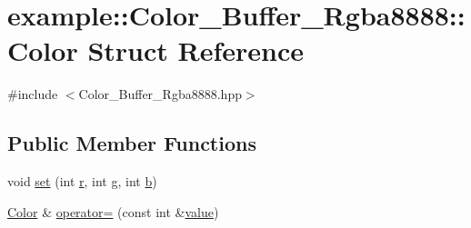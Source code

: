 \hypertarget{structexample_1_1_color___buffer___rgba8888_1_1_color}{}\section{example\+::Color\+\_\+\+Buffer\+\_\+\+Rgba8888\+::Color Struct Reference}
\label{structexample_1_1_color___buffer___rgba8888_1_1_color}


{\ttfamily \#include $<$Color\+\_\+\+Buffer\+\_\+\+Rgba8888.\+hpp$>$}

\subsection*{Public Member Functions}
\begin{DoxyCompactItemize}
\item 
void \mbox{\hyperlink{structexample_1_1_color___buffer___rgba8888_1_1_color_ab468e761b5196e508eff6cf396d50cce}{set}} (int \mbox{\hyperlink{structexample_1_1_color___buffer___rgba8888_1_1_color_a3ae8419af50bed867580b5ca28b9e254}{r}}, int \mbox{\hyperlink{structexample_1_1_color___buffer___rgba8888_1_1_color_a02b8df3c9800b6d9efab7872ead00da1}{g}}, int \mbox{\hyperlink{structexample_1_1_color___buffer___rgba8888_1_1_color_a9213fba01a28ef7dbe871fe2669a0226}{b}})
\item 
\mbox{\hyperlink{structexample_1_1_color___buffer___rgba8888_1_1_color}{Color}} \& \mbox{\hyperlink{structexample_1_1_color___buffer___rgba8888_1_1_color_ada91a7b49ff32dc823e5cf733fc94b55}{operator=}} (const int \&\mbox{\hyperlink{structexample_1_1_color___buffer___rgba8888_1_1_color_aa8c3f5e3038dd7743aab9592023418e4}{value}})
\end{DoxyCompactItemize}
